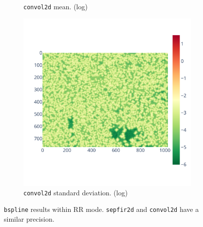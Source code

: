 \documentclass[11pt]{article}
\newcommand{\tristan}[1]{\color{orange}\textbf{From Tristan:} #1\color{black}\xspace}
\begin{document}
\begin{figure}
\begin{subfigure}{0.3\linewidth}
    \caption{\centering\texttt{convol2d} mean. \newline (log)}
    \label{fig:bspline_convol2d_mean}
\end{subfigure}
\begin{subfigure}{0.3\linewidth}
    \includegraphics[width=\linewidth]{figure/bspline/convol2d_std_log.pdf}
    \caption{\centering\texttt{convol2d} standard deviation. (log)}
    \label{fig:bspline_convol2d_std}
\end{subfigure}
    \caption{\texttt{bspline} results within RR mode. \texttt{sepfir2d} and
 \texttt{convol2d} have a similar precision.
    }
    \label{fig:bspline_rr}
\end{figure}
\end{document}
